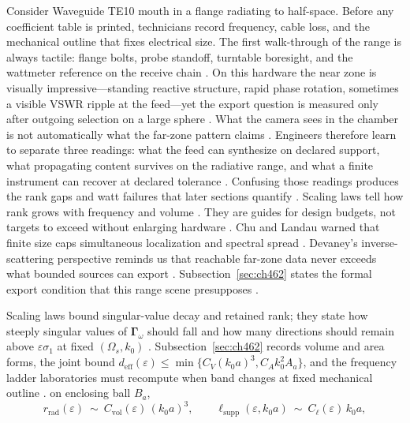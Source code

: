 \begin{physicalvignette}
Consider Waveguide TE10 mouth in a flange radiating to half-space. Before any coefficient table is printed, technicians record frequency, cable loss, and the mechanical outline that fixes electrical size. The first walk-through of the range is always tactile: flange bolts, probe standoff, turntable boresight, and the wattmeter reference on the receive chain \cite{hansen1988}.
On this hardware the near zone is visually impressive---standing reactive structure, rapid phase rotation, sometimes a visible VSWR ripple at the feed---yet the export question is measured only after outgoing selection on a large sphere \cite{harrington2001}. What the camera sees in the chamber is not automatically what the far-zone pattern claims \cite{stratton1941}.
Engineers therefore learn to separate three readings: what the feed can synthesize on declared support, what propagating content survives on the radiative range, and what a finite instrument can recover at declared tolerance \cite{devaney2004}. Confusing those readings produces the rank gaps and watt failures that later sections quantify \cite{pal2026}.
Scaling laws tell how rank grows with frequency and volume . They are guides for design budgets, not targets to exceed without enlarging hardware .
Chu and Landau warned that finite size caps simultaneous localization and spectral spread \cite{chu1948}. Devaney's inverse-scattering perspective reminds us that reachable far-zone data never exceeds what bounded sources can export \cite{devaney2004}.
Subsection~\ref{sec:ch462} states the formal export condition that this range scene presupposes \cite{stratton1941}.
\end{physicalvignette}
Scaling laws bound singular-value decay and retained rank; they state how steeply singular values of $\boldsymbol{\Gamma}_\omega$ should fall and how many directions should remain above $\varepsilon\sigma_{1}$ at fixed $(\Omega_s,k_0)$ \cite{hansen1988}. Subsection~\ref{sec:ch462} records volume and area forms, the joint bound $d_{\mathrm{eff}}(\varepsilon)\le\min\{C_V(k_0 a)^3,C_A k_0^2 A_a\}$, and the frequency ladder laboratories must recompute when band changes at fixed mechanical outline \cite{jackson1999}.
on enclosing ball \(B_{a}\),
\begin{equation}
\label{eq:ch4.truncation-volume-scaling}
r_{\mathrm{rad}}(\varepsilon)
\ \sim\
C_{\mathrm{vol}}(\varepsilon)\,(k_{0}a)^{3},
\qquad
\ell_{\mathrm{supp}}(\varepsilon,k_{0}a)
\ \sim\
C_{\ell}(\varepsilon)\,k_{0}a,
\end{equation}
